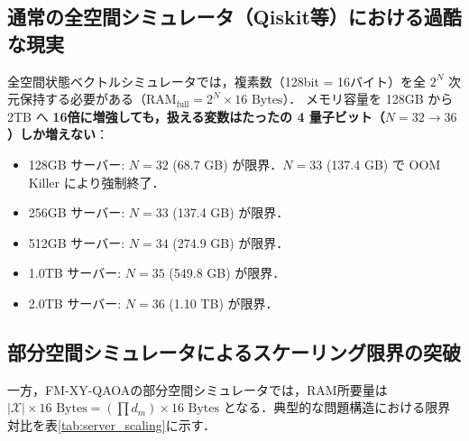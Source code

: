 \documentclass[11pt,a4paper]{ltjsarticle}
\begin{document}
\subsection{通常の全空間シミュレータ（Qiskit等）における過酷な現実}
全空間状態ベクトルシミュレータでは，複素数（128bit = 16バイト）を全 $2^N$ 次元保持する必要がある（$\text{RAM}_{\mathrm{full}} = 2^N \times 16 \text{ Bytes}$）．
メモリ容量を 128GB から 2TB へ \textbf{16倍に増強しても，扱える変数はたったの 4 量子ビット（$N=32 \to 36$）しか増えない}：
\begin{itemize}\setlength{\itemsep}{1pt}
    \item 128GB サーバー: $N=32$ (68.7 GB) が限界．$N=33$ (137.4 GB) で OOM Killer により強制終了．
    \item 256GB サーバー: $N=33$ (137.4 GB) が限界．
    \item 512GB サーバー: $N=34$ (274.9 GB) が限界．
    \item 1.0TB サーバー: $N=35$ (549.8 GB) が限界．
    \item 2.0TB サーバー: $N=36$ (1.10 TB) が限界．
\end{itemize}

\subsection{部分空間シミュレータによるスケーリング限界の突破}
一方，FM-XY-QAOAの部分空間シミュレータでは，RAM所要量は $|\mathcal{X}| \times 16\text{ Bytes} = (\prod d_m) \times 16\text{ Bytes}$ となる．典型的な問題構造における限界対比を表\ref{tab:server_scaling}に示す．
\end{document}
